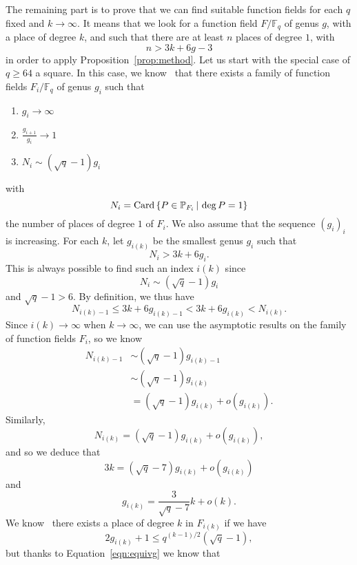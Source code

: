 \documentclass[a4paper,11pt]{article}
\begin{document}
The remaining part is to prove that we can find suitable function fields for
each $q$ fixed and $k\to\infty$. It means that we look for a function field
$F/\mathbb{F}_q$ of genus $g$, with a place of degree $k$, and such that there
are at least $n$ places of degree $1$, with
\[
  n > 3k +6g - 3
\]
in order to apply Proposition~\ref{prop:method}. Let us start with the special case of $q\geq64$
a square. In this case, we know~\cite{STV92} that there exists a family of function fields
$F_i/\mathbb{F}_q$ of genus $g_i$ such that
\begin{enumerate}
  \item $g_i\to\infty$
  \item $\frac{g_{i+1}}{g_i}\to1$
  \item $N_i\sim (\sqrt q - 1)g_i$
\end{enumerate}
with
\[
  N_i = \operatorname{Card}\left\{ P\in\mathbb{P}_{F_i}\,|\,\deg P = 1 \right\}
\]
the number of places of degree $1$ of $F_i$. We also assume that the sequence
$(g_i)_i$ is increasing. For each $k$, let $g_{i(k)}$ be the
smallest genus $g_i$ such that
\[
  N_{i} > 3k + 6g_{i}.
\]
This is always possible to find such an index $i(k)$ since
\[
  N_i\sim (\sqrt q - 1)g_i
\]
and $\sqrt q -1 > 6$. By definition, we thus have
\[
  N_{i(k)-1}\leq 3k+6g_{i(k)-1}<3k+6g_{i(k)}<N_{i(k)}.
\]
Since $i(k)\to\infty$ when $k\to\infty$, we can use the asymptotic results on the
family of function fields $F_i$, so we know
\begin{equation*}
  \begin{split}
  N_{i(k)-1} &\sim (\sqrt q-1)g_{i(k)-1}\\
  &\sim (\sqrt q-1)g_{i(k)}\\
  &= (\sqrt q-1)g_{i(k)}+o(g_{i(k)}).
  \end{split}
\end{equation*}
Similarly,
\[
  N_{i(k)} = (\sqrt q -1)g_{i(k)}+o(g_{i(k)}),
\]
and so we deduce that
\begin{equation}
  3k = (\sqrt q -7)g_{i(k)} + o(g_{i(k)})
  \label{eqn:equivg}
\end{equation}
and
\begin{equation}
  g_{i(k)}= \frac{3}{\sqrt q - 7}k+o(k).
  \label{equivk}
\end{equation}
We know~\cite[Corollary 5.2.10.]{Stichtenoth09} there exists a place of degree
$k$ in $F_{i(k)}$ if we have
\begin{equation}
  2g_{i(k)} +1 \leq q^{(k-1)/2}(\sqrt q-1),
  \label{eqn:degreek}
\end{equation}
but thanks to Equation~\eqref{eqn:equivg} we know that
\end{document}
